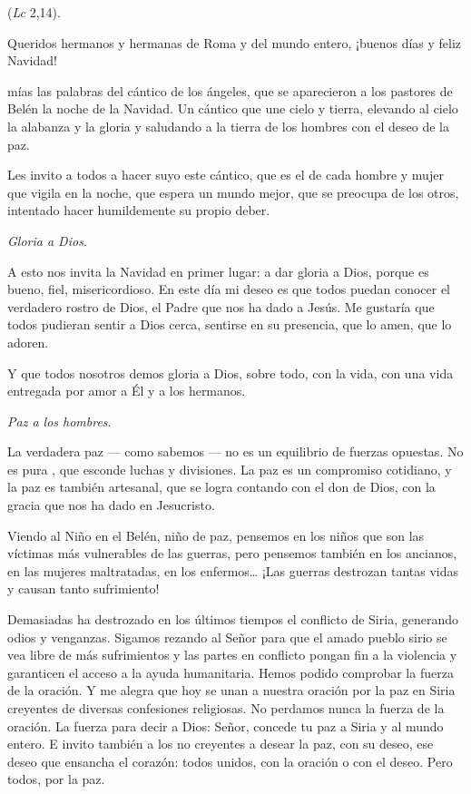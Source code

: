 \begin{body}
	\emph{} (\emph{Lc} 2,14).
	
	Queridos hermanos y hermanas de Roma y del mundo entero, ¡buenos días y feliz Navidad!
	
	 mías las palabras del cántico de los ángeles, que se aparecieron a los pastores de Belén la noche de la Navidad. Un cántico que une cielo y tierra, elevando al cielo la alabanza y la gloria y saludando a la tierra de los hombres con el deseo de la paz.
	
	Les invito a todos a hacer suyo este cántico, que es el de cada hombre y mujer que vigila en la noche, que espera un mundo mejor, que se preocupa de los otros, intentado hacer humildemente su propio deber.
	
	\emph{Gloria a Dios}.
	
	A esto nos invita la Navidad en primer lugar: a dar gloria a Dios, porque es bueno, fiel, misericordioso. En este día mi deseo es que todos puedan conocer el verdadero rostro de Dios, el Padre que nos ha dado a Jesús. Me gustaría que todos pudieran sentir a Dios cerca, sentirse en su presencia, que lo amen, que lo adoren.
	
	Y que todos nosotros demos gloria a Dios, sobre todo, con la vida, con una vida entregada por amor a Él y a los hermanos.
	
	\emph{Paz a los hombres}.
	
	La verdadera paz --- como sabemos --- no es un equilibrio de fuerzas opuestas. No es pura , que esconde luchas y divisiones. La paz es un compromiso cotidiano, y la paz es también artesanal, que se logra contando con el don de Dios, con la gracia que nos ha dado en Jesucristo.
	
	Viendo al Niño en el Belén, niño de paz, pensemos en los niños que son las víctimas más vulnerables de las guerras, pero pensemos también en los ancianos, en las mujeres maltratadas, en los enfermos\ldots{} ¡Las guerras destrozan tantas vidas y causan tanto sufrimiento!
	
	Demasiadas ha destrozado en los últimos tiempos el conflicto de Siria, generando odios y venganzas. Sigamos rezando al Señor para que el amado pueblo sirio se vea libre de más sufrimientos y las partes en conflicto pongan fin a la violencia y garanticen el acceso a la ayuda humanitaria. Hemos podido comprobar la fuerza de la oración. Y me alegra que hoy se unan a nuestra oración por la paz en Siria creyentes de diversas confesiones religiosas. No perdamos nunca la fuerza de la oración. La fuerza para decir a Dios: Señor, concede tu paz a Siria y al mundo entero. E invito también a los no creyentes a desear la paz, con su deseo, ese deseo que ensancha el corazón: todos unidos, con la oración o con el deseo. Pero todos, por la paz.
	

\end{body}

